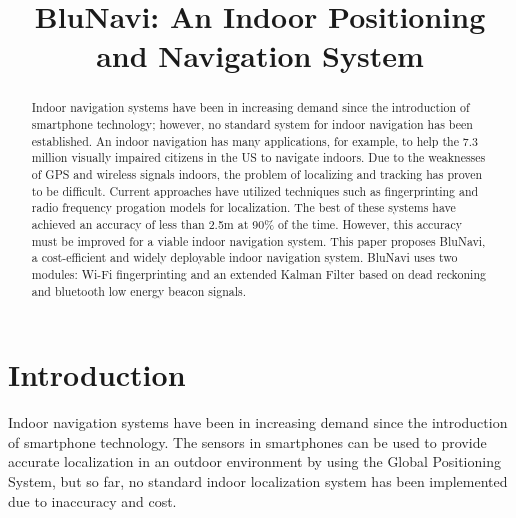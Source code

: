 \documentclass[conference]{IEEEtran}
\begin{document}
\title{BluNavi: An Indoor Positioning and Navigation System}

\author{
\and
{}
\and
{}
}

\maketitle

\begin{abstract}
Indoor navigation systems have been in increasing demand since the introduction of smartphone technology; however, no standard system for indoor navigation has been established. An indoor navigation has many applications, for example, to help the 7.3 million visually impaired citizens in the US to navigate indoors. Due to the weaknesses of GPS and wireless signals indoors, the problem of localizing and tracking has proven to be difficult. Current approaches have utilized techniques such as fingerprinting and radio frequency progation models for localization. The best of these systems have achieved an accuracy of less than 2.5m at 90\% of the time. However, this accuracy must be improved for a viable indoor navigation system. This paper proposes BluNavi, a cost-efficient and widely deployable indoor navigation system. BluNavi uses two modules: Wi-Fi fingerprinting and an extended Kalman Filter based on dead reckoning and bluetooth low energy beacon signals.
\end{abstract}


\section{Introduction}
Indoor navigation systems have been in increasing demand since the introduction of smartphone technology. The sensors in smartphones can be used to provide accurate localization in an outdoor environment by using the Global Positioning System, but so far, no standard indoor localization system has been implemented due to inaccuracy and cost.
\end{document}
